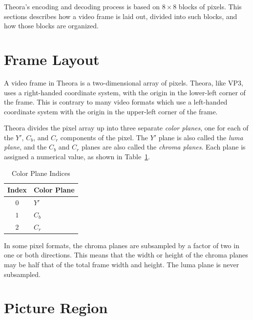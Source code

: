 \documentclass[11pt,letterpaper]{book}
\newcommand{\term}[1]{{\em #1}}
\numberwithin{equation}{chapter}
\numberwithin{figure}{chapter}
\numberwithin{table}{chapter}
\begin{document}
Theora's encoding and decoding process is based on $8\times 8$ blocks of pixels.
This sections describes how a video frame is laid out, divided into such
blocks, and how those blocks are organized.

\section{Frame Layout}

A video frame in Theora is a two-dimensional array of pixels.
Theora, like VP3, uses a right-handed coordinate system, with the origin in the
 lower-left corner of the frame.
This is contrary to many video formats which use a left-handed coordinate
 system with the origin in the upper-left corner of the frame.

Theora divides the pixel array up into three separate \term{color planes}, one
 for each of the $Y'$, $C_b$, and $C_r$ components of the pixel.
The $Y'$ plane is also called the \term{luma plane}, and the $C_b$ and $C_r$
 planes are also called the \term{chroma planes}.
Each plane is assigned a numerical value, as shown in
 Table~\ref{tab:color-planes}.

\begin{table}[htb]
\begin{center}
\begin{tabular}{cl}\toprule
Index & Color Plane \\\midrule
$0$   & $Y'$        \\
$1$   & $C_b$       \\
$2$   & $C_r$       \\
\bottomrule\end{tabular}
\end{center}
\caption{Color Plane Indices}
\label{tab:color-planes}
\end{table}

In some pixel formats, the chroma planes are subsampled by a factor of two
 in one or both directions.
This means that the width or height of the chroma planes may be half that of
 the total frame width and height.
The luma plane is never subsampled.

\section{Picture Region}
\end{document}
